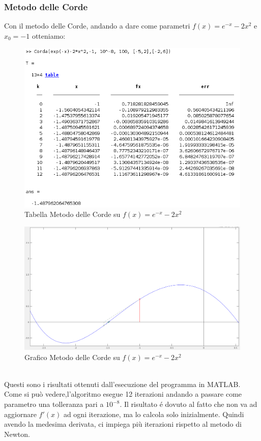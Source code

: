 \documentclass[12pt, letterpaper]{article}
\begin{document}
\subsubsection{Metodo delle Corde}
Con il metodo delle Corde, andando a dare come parametri $f(x)=e^{-x}-2x^2$ e $x_0=-1$ otteniamo: 
\begin{figure}[ht!]
    \includegraphics[scale=0.59]{TabellaEsponenzialeChord.png}
    \caption{Tabella Metodo delle Corde su $f(x)=e^{-x}-2x^2$}
\end{figure}
\begin{figure}[ht!]
    \includegraphics[scale=0.40]{EsponenzialeChord.png}
    \caption{Grafico Metodo delle Corde su $f(x)=e^{-x}-2x^2$}
\end{figure} \\



Questi sono i risultati ottenuti dall'esecuzione del programma in MATLAB.\\ Come si può vedere,l'algoritmo esegue 12 iterazioni andando a passare come parametro una tolleranza pari a $10^{-8}$.
Il risultato \'e dovuto al fatto che non va ad aggiornare $f'(x)$ ad ogni iterazione, ma lo calcola solo inizialmente. Quindi avendo la medesima derivata, ci impiega più iterazioni rispetto al metodo di Newton.    
\end{document}
